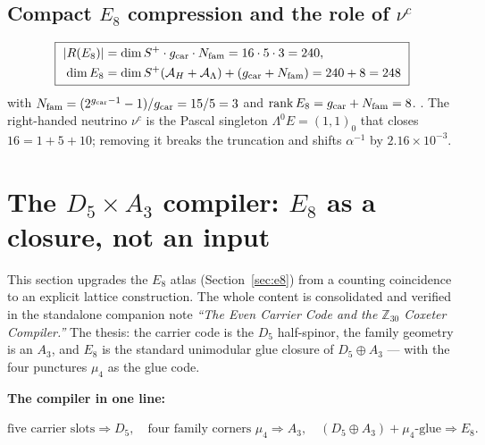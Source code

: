 \subsection{Compact $E_8$ compression and the role of $\nu^c$}
\begin{equation}
  \boxed{\ \begin{aligned}
    |R(E_8)|&=\dim S^+\cdot g_{\mathrm{car}}\cdot N_{\mathrm{fam}}=16\cdot5\cdot3=240,\\
    \dim E_8&=\dim S^+(\mathcal A_H+\mathcal A_\Lambda)+(g_{\mathrm{car}}+N_{\mathrm{fam}})=240+8=248
  \end{aligned}\ }
\end{equation}
with $N_{\mathrm{fam}}=(2^{g_{\mathrm{car}}-1}-1)/g_{\mathrm{car}}=15/5=3$ and $\operatorname{rank}E_8=g_{\mathrm{car}}+N_{\mathrm{fam}}=8$. \mE. The
right-handed neutrino $\nu^c$ is the Pascal singleton $\Lambda^0E=(1,1)_0$ that closes $16=1+5+10$;
removing it breaks the truncation and shifts $\alpha^{-1}$ by $2.16\times10^{-3}$.

\section{The $D_5\times A_3$ compiler: $E_8$ as a closure, not an input}
\label{sec:d5a3}
This section upgrades the $E_8$ atlas (Section~\ref{sec:e8}) from a counting coincidence to an explicit
lattice construction. The whole content is consolidated and verified in the standalone companion note
\emph{``The Even Carrier Code and the $\mathbb Z_{30}$ Coxeter Compiler.''} The thesis: the carrier
code is the $D_5$ half-spinor, the family geometry is an $A_3$, and $E_8$ is the standard unimodular
glue closure of $D_5\oplus A_3$ --- with the four punctures $\mu_4$ as the glue code.

\TFPTeightglue

\par\smallskip\noindent\textbf{The compiler in one line:}
\begin{keyeq}
$\displaystyle \text{five carrier slots}\Rightarrow D_5,\quad
  \text{four family corners }\mu_4\Rightarrow A_3,\quad
  (D_5\oplus A_3)+\mu_4\text{-glue}\Rightarrow E_8.$
\end{keyeq}

